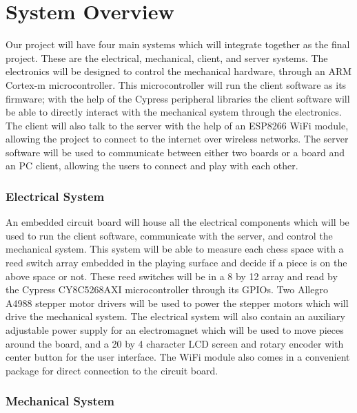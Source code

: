 \documentclass{article}
\begin{document}
\section*{System Overview}
\indent

Our project will have four main systems which will integrate together as the final project. These are the electrical, mechanical, client, and server systems. The electronics will be designed to control the mechanical hardware, through an ARM Cortex-m microcontroller. This microcontroller will run the client software as its firmware; with the help of the Cypress peripheral libraries the client software will be able to directly interact with the mechanical system through the electronics. The client will also talk to the server with the help of an ESP8266 WiFi module, allowing the project to connect to the internet over wireless networks. The server software will be used to communicate between either two boards or a board and an PC client, allowing the users to connect and play with each other.

\subsubsection*{Electrical System}
\indent

An embedded circuit board will house all the electrical components which will be used to run the client software, communicate with the server, and control the mechanical system. This system will be able to measure each chess space with a reed switch array embedded in the playing surface and decide if a piece is on the above space or not. These reed switches will be in a 8 by 12 array and read by the Cypress CY8C5268AXI microcontroller through its GPIOs. Two Allegro A4988 stepper motor drivers will be used to power the stepper motors which will drive the mechanical system. The electrical system will also contain an auxiliary adjustable power supply for an electromagnet which will be used to move pieces around the board, and a 20 by 4 character LCD screen and rotary encoder with center button for the user interface. The WiFi module also comes in a convenient package for direct connection to the circuit board.

\subsubsection*{Mechanical System}
\indent
\end{document}
